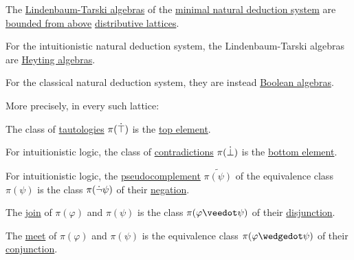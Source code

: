 \begin{proposition}\label{thm:lindenbaum_tarski_algebras}
  The \hyperref[def:lindenbaum_tarski_algebra]{Lindenbaum-Tarski algebras} of the \hyperref[def:propositional_natural_deduction_systems]{minimal natural deduction system} are \hyperref[def:extremal_points/bounds]{bounded from above} \hyperref[def:distributive_lattice]{distributive lattices}.

  \begin{thmenum}[series=thm:lindenbaum_tarski_algebras]
     For the intuitionistic natural deduction system, the Lindenbaum-Tarski algebras are \hyperref[def:heyting_algebra]{Heyting algebras}.

     For the classical natural deduction system, they are instead \hyperref[def:boolean_algebra]{Boolean algebras}.
  \end{thmenum}

  More precisely, in every such lattice:
  \begin{thmenum}[resume=thm:lindenbaum_tarski_algebras]
     The class of \hyperref[def:propositional_tautology]{tautologies} \( \pi(\dot\top) \) is the \hyperref[def:extremal_points/top_and_bottom]{top element}.

     For intuitionistic logic, the class of \hyperref[def:propositional_contradiction]{contradictions} \( \pi(\dot\bot) \) is the \hyperref[def:extremal_points/top_and_bottom]{bottom element}.

     For intuitionistic logic, the \hyperref[eq:def:heyting_algebra/pseudocomplement]{pseudocomplement} \( \widetilde{\pi(\psi)} \) of the equivalence class \( \pi(\psi) \) is the class \( \pi(\dot\neg \psi) \) of their \hyperref[def:propositional_alphabet/negation]{negation}.

     The \hyperref[def:lattice/join]{join} of \( \pi(\varphi) \) and \( \pi(\psi) \) is the class \( \pi(\varphi \synvee \psi) \) of their \hyperref[def:propositional_alphabet/connectives/disjunction]{disjunction}.

     The \hyperref[def:lattice/meet]{meet} of \( \pi(\varphi) \) and \( \pi(\psi) \) is the equivalence class \( \pi(\varphi \synwedge \psi) \) of their \hyperref[def:propositional_alphabet/connectives/conjunction]{conjunction}.


\end{thmenum}
\end{proposition}
